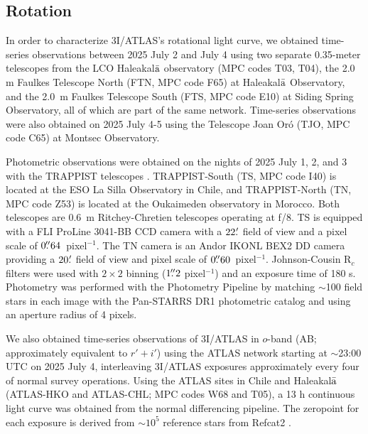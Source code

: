 \documentclass[twocolumn,longbib]{aastex7}
\begin{document}
\begin{CJK*}{UTF8}{gbsn}
\subsection{Rotation}\label{sec:rotation}

In order to characterize 3I/ATLAS's rotational light curve, we obtained time-series observations between 2025 July 2 and July 4 using two separate 0.35-meter telescopes from the LCO Haleakal${\rm\bar{a}}$ observatory (MPC codes T03, T04), the 2.0 m Faulkes Telescope North (FTN, MPC code F65) at Haleakal${\rm\bar{a}}$ Observatory, and the 2.0~m Faulkes Telescope South (FTS, MPC code E10) at Siding Spring Observatory, all of which are part of the same network.  Time-series observations were also obtained on 2025 July 4-5 using the Telescope Joan Or\'{o} (TJO, MPC code C65) at Montsec Observatory.

Photometric observations were obtained on the nights of 2025 July 1, 2, and 3 with the TRAPPIST telescopes \citep{jehin2011trappist}. TRAPPIST-South (TS, MPC code I40) is located at the ESO La Silla Observatory in Chile, and TRAPPIST-North (TN, MPC code Z53) is located at the Oukaimeden observatory in Morocco. Both telescopes are 0.6~m Ritchey-Chretien telescopes operating at f/8. TS is equipped with a FLI ProLine 3041-BB CCD camera with a $22\mbox{$.\mkern-4mu^\prime$}$ field of view and a pixel scale of $0\mbox{$.\!\!^{\prime\prime}$}64$~pixel$^{-1}$. The TN camera is an Andor IKONL BEX2 DD camera providing a $20\mbox{$.\mkern-4mu^\prime$}$ field of view and pixel scale of $0\mbox{$.\!\!^{\prime\prime}$}60$~pixel$^{-1}$. Johnson-Cousin R$_c$ filters were used with $2\times2$ binning ($1\mbox{$.\!\!^{\prime\prime}$}2$ pixel$^{-1}$) and an exposure time of 180 s.  Photometry was performed with the Photometry Pipeline \citep{mommert2017photometrypipeline} by matching $\sim$100 field stars in each image with the Pan-STARRS DR1 photometric catalog and using an aperture radius of 4 pixels.

We also obtained time-series observations of 3I/ATLAS in $o$-band (AB; approximately equivalent to $r'+i'$) using the ATLAS network starting at $\sim$23:00 UTC on 2025 July 4, interleaving 3I/ATLAS exposures approximately every four of normal survey operations.  Using the ATLAS sites in Chile and Haleakal${\rm\bar{a}}$ (ATLAS-HKO and ATLAS-CHL; MPC codes W68 and T05), a 13 h continuous light curve was obtained from the normal differencing pipeline. The zeropoint for each exposure is derived from $\sim10^5$ reference stars from Refcat2 \citep{Tonry2018b}.


\end{CJK*}
\end{document}
